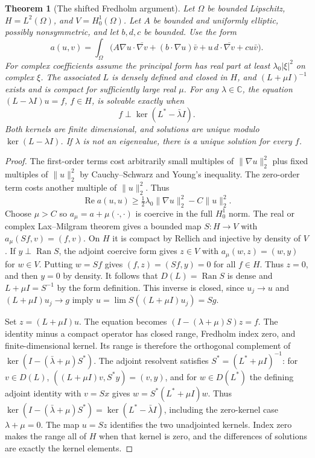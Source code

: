 \documentclass[11pt,oneside,openany]{book}
\theoremstyle{plain}
\newtheorem{theorem}{Theorem}[chapter]
\theoremstyle{definition}
\theoremstyle{remark}
\begin{document}
\begin{theorem}[The shifted Fredholm argument]
\label{pde:elliptic-fredholm}
Let \(\Omega\) be bounded Lipschitz, \(H=L^2(\Omega)\), and
\(V=H_0^1(\Omega)\). Let \(A\) be bounded and uniformly
elliptic, possibly nonsymmetric, and let \(b,d,c\) be
bounded. Use the form
\[
 a(u,v)=\int_\Omega \bigl(
 A\nabla u\cdot\overline{\nabla v}
       +(b\cdot\nabla u)\bar v+u\,d\cdot\overline{\nabla v}
       +c u\bar v\bigr).
\]
For complex coefficients assume the principal form has
real part at least \(\lambda_0|\xi|^2\) on complex \(\xi\).
The associated \(L\) is densely defined and closed in \(H\),
and \((L+\mu I)^{-1}\) exists and is compact for sufficiently
large real \(\mu\).
For any \(\lambda\in\mathbb C\), the equation
\((L-\lambda I)u=f\), \(f\in H\), is solvable exactly when
\[
 f\perp\ker(L^*-\bar\lambda I).
\]
Both kernels are finite dimensional, and solutions are unique
modulo \(\ker(L-\lambda I)\). If \(\lambda\) is not an
eigenvalue, there is a unique solution for every \(f\).
\end{theorem}

\begin{proof}
The first-order terms cost arbitrarily small multiples
of \(\|\nabla u\|_2^2\) plus fixed multiples of \(\|u\|_2^2\)
by Cauchy--Schwarz and Young's inequality. The zero-order
term costs another multiple of \(\|u\|_2^2\). Thus
\[
 \operatorname{Re}a(u,u)\geq
       \tfrac12\lambda_0\|\nabla u\|_2^2-C\|u\|_2^2.
\]
Choose \(\mu>C\) so \(a_\mu=a+\mu(\cdot,\cdot)\) is coercive
in the full \(H_0^1\) norm. The real or complex Lax--Milgram
theorem gives a bounded map \(S:H\to V\) with
\(a_\mu(Sf,v)=(f,v)\). On \(H\) it is compact by Rellich
and injective by density of \(V\).
If \(y\perp\operatorname{Ran}S\), the adjoint coercive form
gives \(z\in V\) with \(a_\mu(w,z)=(w,y)\) for \(w\in V\).
Putting \(w=Sf\) gives \((f,z)=(Sf,y)=0\) for all \(f\in H\).
Thus \(z=0\), and then \(y=0\) by density.
It follows that \(D(L)=\operatorname{Ran}S\) is dense and
\(L+\mu I=S^{-1}\) by the form definition.
This inverse is closed, since \(u_j\to u\) and
\((L+\mu I)u_j\to g\) imply
\(u=\lim S((L+\mu I)u_j)=Sg\).

Set \(z=(L+\mu I)u\). The equation becomes
\((I-(\lambda+\mu)S)z=f\).
The identity minus a compact operator has closed range,
Fredholm index zero, and finite-dimensional kernel.
Its range is therefore the orthogonal complement of
\(\ker(I-(\bar\lambda+\mu)S^*)\).
The adjoint resolvent satisfies \(S^*=(L^*+\mu I)^{-1}\):
for \(v\in D(L)\), \(((L+\mu I)v,S^*y)=(v,y)\),
and for \(w\in D(L^*)\) the defining adjoint identity
with \(v=Sx\) gives \(w=S^*(L^*+\mu I)w\).
Thus \(\ker(I-(\bar\lambda+\mu)S^*)=
\ker(L^*-\bar\lambda I)\), including the zero-kernel case
\(\lambda+\mu=0\). The map \(u=Sz\) identifies the two
unadjointed kernels. Index zero makes the range all of
\(H\) when that kernel is zero, and the differences of
solutions are exactly the kernel elements.
\end{proof}
\end{document}
